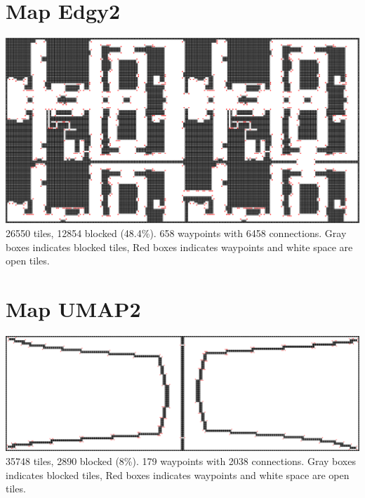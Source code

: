 \documentclass[a4paper]{article}
\begin{document}
\flushleft
\pagebreak
\section{Map Edgy2}\label{ap.edgy2}
\centering
\includegraphics[width=\textwidth,height=\textheight,keepaspectratio]{ChartsAndFigures/Edgy2.png}
26550 tiles, 12854 blocked (48.4\%). 658 waypoints with 6458 connections. Gray boxes indicates blocked tiles, Red boxes indicates waypoints and white space are open tiles.

\flushleft
\section{Map UMAP2}\label{ap.umap2}
\centering
\includegraphics[width=\textwidth,height=\textheight,keepaspectratio]{ChartsAndFigures/UMAP2.png}
35748 tiles, 2890 blocked (8\%). 179 waypoints with 2038 connections. Gray boxes indicates blocked tiles, Red boxes indicates waypoints and white space are open tiles.
\end{document}
